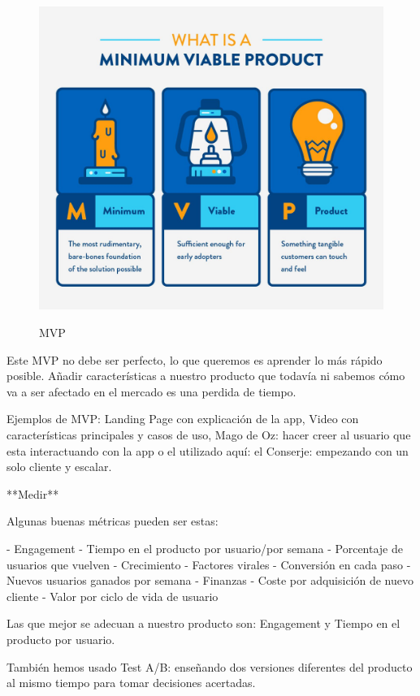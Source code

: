 \documentclass[12pt,twoside,titlepage]{report}
\begin{document}
\begin{figure}[H]
    \centering
    \includegraphics[scale=0.1]{Lean Startup/MVP}
    \label{fig:MVP}
    \caption{MVP}
\end{figure}

Este MVP no debe ser perfecto, lo que queremos es aprender lo más rápido posible. Añadir características a nuestro producto que todavía ni sabemos cómo va a ser afectado en el mercado es una perdida de tiempo.

Ejemplos de MVP: Landing Page con explicación de la app, Video con características principales y casos de uso, Mago de Oz: hacer creer al usuario que esta interactuando con la app o el utilizado aquí: el Conserje: empezando con un solo cliente y escalar.

**Medir**

Algunas buenas métricas pueden ser estas: 

- Engagement
- Tiempo en el producto por usuario/por semana
- Porcentaje de usuarios que vuelven
- Crecimiento
- Factores virales
- Conversión en cada paso
- Nuevos usuarios ganados por semana
- Finanzas
- Coste por adquisición de nuevo cliente
- Valor por ciclo de vida de usuario

Las que mejor se adecuan a nuestro producto son: Engagement y Tiempo en el producto por usuario.

También hemos usado Test A/B: enseñando dos versiones diferentes del producto al mismo tiempo para tomar decisiones acertadas.
\end{document}
